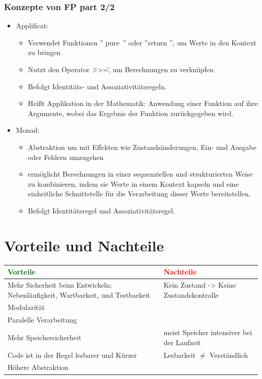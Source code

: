 \documentclass{beamer}
\begin{document}
\begin{frame}
\frametitle{Konzepte  von FP part 2/2} 
	\begin{itemize}
	    \item Applificat: 
	\begin{itemize}
		\item Verwendet Funktionen   '' pure\ '' oder  ''return '', um Werte in den Kontext zu bringen
		\item Nutzt den Operator \">>=\" , um Berechnungen zu verknüpfen
		\item Befolgt Identitäts- und Assoziativitätsregeln.
		\item Heißt Applikation in der Mathematik:  Anwendung einer Funktion auf ihre Argumente, wobei das Ergebnis der Funktion zurückgegeben wird. 
	\end{itemize}
	\item Monad: \begin{itemize}
		\item Abstraktion um mit Effekten wie Zustandsänderungen, Ein- und Ausgabe oder Fehlern umzugehen 
		\item ermöglicht  Berechnungen in einer sequenziellen und strukturierten Weise zu kombinieren, indem sie Werte in einem Kontext kapseln und eine einheitliche Schnittstelle für die Verarbeitung dieser Werte bereitstellen. 
		\item Befolgt Identitätsregel und Assoziativitätsregel.
	\end{itemize}
	\end{itemize}
\end{frame}

\section{Vorteile und Nachteile}
\begin{frame}
\centering
	\begin{tabular}{ |p{5cm}|p{5cm}|  }
		\hline
             \textcolor{darkgreen}{Vorteile} & \textcolor{red}{Nachteile} \\
		\hline
		Mehr Sicherheit beim Entwickeln: Nebenläufigkeit, Wartbarkeit, und Testbarkeit & Kein Zustand -> Keine Zustandskontrolle \\
            \hline
            Modularität & \\
            Paralelle Verarbeitung& \\
		\hline
            Mehr Speichersicherheit  & meist Speicher intensiver bei der Laufzeit  \\
		\hline
    Code ist in der Regel lesbarer und Kürzer & Lesbarkeit $\neq$ Verständlich \\
            Höhere Abstraktion & \\
		\hline

 \end{tabular}
\end{frame}
\end{document}
